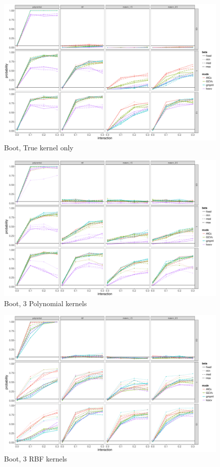 \documentclass[article]{jss}
\begin{document}
\begin{appendix}
\begin{figure}
\begin{center}
\includegraphics[width=0.9\columnwidth]{exp_B1} 
\caption{Boot, True kernel only}
\label{fig:res}
\end{center}
\end{figure}

\begin{figure}
\begin{center}
\includegraphics[width=0.9\columnwidth]{exp_B2} 
\caption{Boot, 3 Polynomial kernels}
\label{fig:res}
\end{center}
\end{figure}

\begin{figure}
\begin{center}
\includegraphics[width=0.9\columnwidth]{exp_B3} 
\caption{Boot, 3 RBF kernels}
\label{fig:res}
\end{center}
\end{figure}


\end{appendix}
\end{document}
